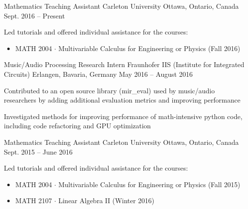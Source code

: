 

\begin{cventries}

  \cventry
    {Mathematics Teaching Assistant} %
    {Carleton University} %
    {Ottawa, Ontario, Canada} %
    {Sept. 2016 – Present} %
    {
      \begin{cvitems} %
        \item {Led tutorials and offered individual assistance for the courses:}
          \begin{itemize}
            \item {MATH 2004 $\cdot$ Multivariable Calculus for Engineering or Physics (Fall 2016)}
          \end{itemize}
      \end{cvitems}
    }

  \cventry
    {Music/Audio Processing Research Intern} %
    {Fraunhofer IIS (Institute for Integrated Circuits)} %
    {Erlangen, Bavaria, Germany} %
    {May 2016 – August 2016} %
    {
      \begin{cvitems} %
        \item {Contributed to an open source library (mir\_eval) used by music/audio researchers by adding additional evaluation metrics and improving performance}
        \item {Investigated methods for improving performance of math-intensive python code, including code refactoring and GPU optimization}
      \end{cvitems}
    }

  \cventry
    {Mathematics Teaching Assistant} %
    {Carleton University} %
    {Ottawa, Ontario, Canada} %
    {Sept. 2015 – June 2016} %
    {
      \begin{cvitems} %
        \item {Led tutorials and offered individual assistance for the courses:}
          \begin{itemize}
            \item {MATH 2004 $\cdot$ Multivariable Calculus for Engineering or Physics (Fall 2015)}
            \item {MATH 2107 $\cdot$ Linear Algebra II (Winter 2016)}
          \end{itemize}
      \end{cvitems}
    }


\end{cventries}
